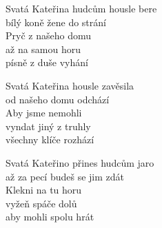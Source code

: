 
\ve{}
Svatá Kateřina hudcům housle bere\\
bílý koně žene do strání\\
Pryč z našeho domu\\
až na samou horu\\
písně z duše vyhání

\ve{}
Svatá Kateřina housle zavěsila\\
od našeho domu odchází\\
Aby jsme nemohli\\
vyndat jiný z truhly\\
všechny klíče rozhází

\ve{}
Svatá Kateřino přines hudcům jaro\\
až za pecí budeš se jim zdát\\
Klekni na tu horu\\
vyžeň spáče dolů\\
aby mohli spolu hrát 

\esong